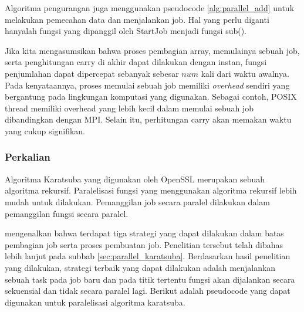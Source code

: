 Algoritma pengurangan juga menggunakan pseudocode \ref{alg:parallel_add} untuk melakukan pemecahan data dan menjalankan job. Hal yang perlu diganti hanyalah fungsi yang dipanggil oleh StartJob menjadi fungsi sub().

Jika kita mengasumsikan bahwa proses pembagian array, memulainya sebuah job, serta penghitungan carry di akhir dapat dilakukan dengan instan, fungsi penjumlahan dapat dipercepat sebanyak sebesar $num$ kali dari waktu awalnya. Pada kenyataannya, proses memulai sebuah job memiliki \textit{overhead} sendiri yang bergantung pada lingkungan komputasi yang digunakan. Sebagai contoh, POSIX thread memiliki overhead yang lebih kecil dalam memulai sebuah job dibandingkan dengan MPI. Selain itu, perhitungan carry akan memakan waktu yang cukup signifikan.


\subsubsection{Perkalian}

Algoritma Karatsuba yang digunakan oleh OpenSSL merupakan sebuah algoritma rekursif. Paralelisasi fungsi yang menggunakan algoritma rekursif lebih mudah untuk dilakukan. Pemanggilan job secara paralel dilakukan dalam pemanggilan fungsi secara paralel.

\citet{parallel_karatsuba_analysis} mengenalkan bahwa terdapat tiga strategi yang dapat dilakukan dalam batas pembagian job serta proses pembuatan job. Penelitian tersebut telah dibahas lebih lanjut  pada subbab \ref{sec:parallel_karatsuba}. Berdasarkan hasil penelitian yang dilakukan, strategi terbaik yang dapat dilakukan adalah menjalankan sebuah task pada job baru dan pada titik tertentu fungsi akan dijalankan secara sekuensial dan tidak secara paralel lagi. Berikut adalah pseudocode yang dapat digunakan untuk paralelisasi algoritma karatsuba.

